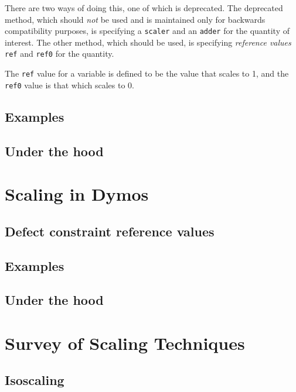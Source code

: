 \documentclass{article}
\begin{document}
There are two ways of doing this, one of which is deprecated. The deprecated method, which should \textit{not} be used and is maintained only for backwards compatibility purposes, is specifying a \texttt{scaler} and an \texttt{adder} for the quantity of interest. The other method, which should be used, is specifying \textit{reference values} \texttt{ref} and \texttt{ref0} for the quantity.

The \texttt{ref} value for a variable is defined to be the value that scales to 1, and the \texttt{ref0} value is that which scales to 0.


\subsection*{Examples}

\subsection*{Under the hood}

\newpage
\section{Scaling in Dymos}

\subsection*{Defect constraint reference values}

\subsection*{Examples}

\subsection*{Under the hood}

\newpage
\section{Survey of Scaling Techniques}

\subsection*{Isoscaling}
\end{document}
